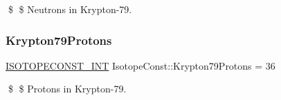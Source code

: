 \$ \$ Neutrons in Krypton-\/79. \mbox{\label{group___isotope_const-_krypton-_kr79_gab0636b618b6089a0764300c66d8a8718}} 
\subsubsection{\texorpdfstring{Krypton79\+Protons}{Krypton79Protons}}
{\footnotesize\ttfamily \mbox{\hyperlink{group___isotope_const-_macros_ga5f18360b3e99483a35c32d789e62621c}{I\+S\+O\+T\+O\+P\+E\+C\+O\+N\+S\+T\+\_\+\+I\+NT}} Isotope\+Const\+::\+Krypton79\+Protons = 36}

\$ \$ Protons in Krypton-\/79. 